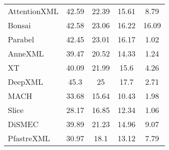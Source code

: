 \begin{table*}[ht]
\begin{subtable}{.48\textwidth}
{\begin{tabular}{@{}l|ccc|c@{}}
AttentionXML	 & 42.59	 & 22.39	 & 15.61	 & 8.79 \\
Bonsai	 & 42.58	 & 23.06	 & 16.22	 & 16.09 \\
Parabel	 & 42.45	 & 23.01	 & 16.17	 & 1.02 \\
AnneXML	 & 39.47	 & 20.52	 & 14.33	 & 1.24 \\
XT	 & 40.09	 & 21.99	 & 15.6	 & 4.26 \\
DeepXML	 & 45.3	 & 25	 & 17.7	 & 2.71 \\
MACH	 & 33.68	 & 15.64	 & 10.43	 & 1.98 \\
Slice	 & 28.17	 & 16.85	 & 12.34	 & 1.06 \\
DiSMEC	 & 39.89	 & 21.23	 & 14.96	 & 9.07 \\
PfastreXML	 & 30.97	 & 18.1	 & 13.12	 & 7.79 \\
\bottomrule
        \end{tabular}}
    \end{subtable} 
\end{table*}